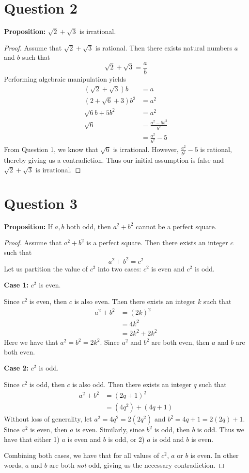 \documentclass[11pt, oneside]{article}   	%
\begin{document}
\section*{Question 2}

\textbf{Proposition:} $\sqrt{2} + \sqrt{3}$ is irrational.

\begin{proof}
Assume that $\sqrt{2} + \sqrt{3}$ is rational. Then there exists natural numbers $a$ and $b$ such that
$$\sqrt{2} +\sqrt{3} = \frac{a}{b}$$
Performing algebraic manipulation yields
\begin{align*}
    (\sqrt{2} + \sqrt{3}) b & = a \\
    (2 + \sqrt{6} + 3)b^2 & =a^2 \\
    \sqrt{6}b + 5b^2 & = a^2 \\
    \sqrt{6} & = \frac{a^2-5b^2}{b^2} \\
    & = \frac{a^2}{b^2} - 5 
\end{align*}
From Question 1, we know that $\sqrt{6}$ is irrational. However, $\frac{a^2}{b^2}-5$ is rational, thereby giving us a contradiction. Thus our initial assumption is false and $\sqrt{2}+\sqrt{3}$ is irrational.
\end{proof}

\section*{Question 3}

\textbf{Proposition:} If $a, b$ both odd, then $a^2+b^2$ cannot be a perfect square.

\begin{proof}
Assume that $a^2+b^2$ is a perfect square. Then there exists an integer $c$ such that
$$a^2+b^2=c^2$$
Let us partition the value of $c^2$ into two cases: $c^2$ is even and $c^2$ is odd.

\textbf{Case 1:} $c^2$ is even.

Since $c^2$ is even, then $c$ is also even. Then there exists an integer $k$ such that
\begin{align*}
	a^2+b^2 & = (2k)^2 \\
	& = 4k^2 \\
	& = 2k^2 + 2k^2
\end{align*}
Here we have that $a^2=b^2 = 2k^2$. Since $a^2$ and $b^2$ are both even, then $a$ and $b$ are both even. 

\textbf{Case 2:} $c^2$ is odd.

Since $c^2$ is odd, then $c$ is also odd. Then there exists an integer $q$ such that
\begin{align*}
	a^2+b^2 & = (2q+1)^2 \\
	& = (4q^2) + (4q+1)
\end{align*}
Without loss of generality, let $a^2=4q^2=2(2q^2)$ and $b^2=4q+1=2(2q)+1$. Since $a^2$ is even, then $a$ is even. Similarly, since $b^2$ is odd, then $b$ is odd. Thus we have that either 1) $a$ is even and $b$ is odd, or 2) $a$ is odd and $b$ is even.

Combining both cases, we have that for all values of $c^2$, $a$ or $b$ is even. In other words, $a$ and $b$ are both \textit{not} odd, giving us the necessary contradiction.
\end{proof}
\end{document}

